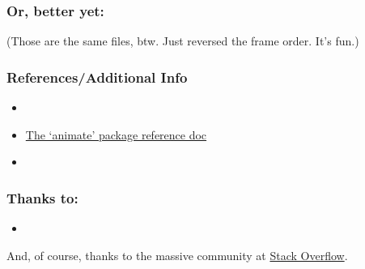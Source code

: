 \documentclass{beamer}
\begin{document}
\begin{frame}
	\frametitle{Or, better yet:}
	\begin{center}
	\end{center}
	\pause
(Those are the same files, btw. Just reversed the frame order. It's fun.)
\end{frame}

\begin{frame}
	\frametitle{References/Additional Info}
	
		\begin{itemize}
			\item \
			\item \href{http://tug.ctan.org/macros/latex/contrib/animate/animate.pdf}{The `animate' package reference doc}
			\item
		\end{itemize}
	
\end{frame}

\begin{frame}
	\frametitle{Thanks to:}
	\begin{itemize}
		\item 
	\end{itemize}
	And, of course, thanks to the massive community at \href{http://stackoverflow.com/}{Stack Overflow}.
\end{frame}
\end{document}
